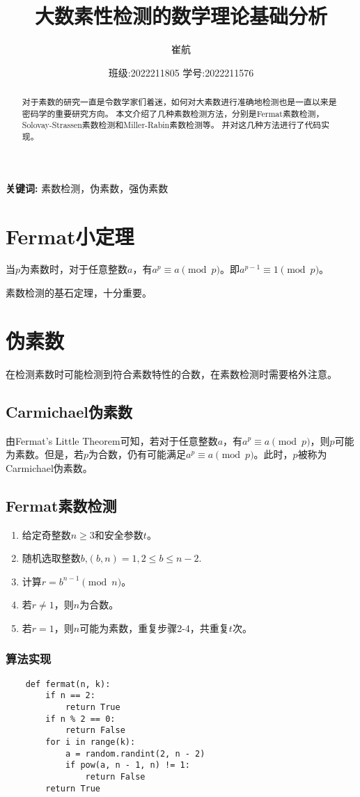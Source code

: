 \documentclass[a4paper]{article}
\title{\heiti\zihao{3} 大数素性检测的数学理论基础分析}
\date{班级:2022211805 学号:2022211576}
\author{\songti 崔航}
\providecommand{\keywords}[1]
{
    \small	
    \textbf{关键词:} #1
}
\providecommand{\keywords}[1]
{
  \small	
  \textbf{关键词:} #1
}
\begin{document}
    \maketitle
\begin{abstract}
    对于素数的研究一直是令数学家们着迷，如何对大素数进行准确地检测也是一直以来是密码学的重要研究方向。
    本文介绍了几种素数检测方法，分别是Fermat素数检测，Solovay-Strassen素数检测和Miller-Rabin素数检测等。
    并对这几种方法进行了代码实现。
\end{abstract}
\keywords{素数检测，伪素数，强伪素数}
\tableofcontents
\section{Fermat小定理}
当$p$为素数时，对于任意整数$a$，有$a^p\equiv a\pmod p$。即$a^{p-1}\equiv1\pmod p$。
\par
素数检测的基石定理，十分重要。
\section{伪素数}
在检测素数时可能检测到符合素数特性的合数，在素数检测时需要格外注意。
\subsection{Carmichael伪素数}
由Fermat's Little Theorem可知，若对于任意整数$a$，有$a^p\equiv a\pmod p$，则$p$可能为素数。但是，若$p$为合数，仍有可能满足$a^p\equiv a\pmod p$。此时，$p$被称为Carmichael伪素数。

\subsection{Fermat素数检测}
\begin{enumerate}
    \item 给定奇整数$n\geq3$和安全参数$t$。
    \item 随机选取整数$b$,$(b,n)=1,2\leq b\leq n-2$.
    \item 计算$r=b^{n-1}\pmod n$。
    \item 若$r\neq1$，则$n$为合数。
    \item 若$r=1$，则$n$可能为素数，重复步骤2-4，共重复$t$次。
\end{enumerate}
\subsubsection{算法实现}
\begin{verbatim}
    def fermat(n, k):
        if n == 2:
            return True
        if n % 2 == 0:
            return False
        for i in range(k):
            a = random.randint(2, n - 2)
            if pow(a, n - 1, n) != 1:
                return False
        return True
\end{verbatim}
\end{document}
